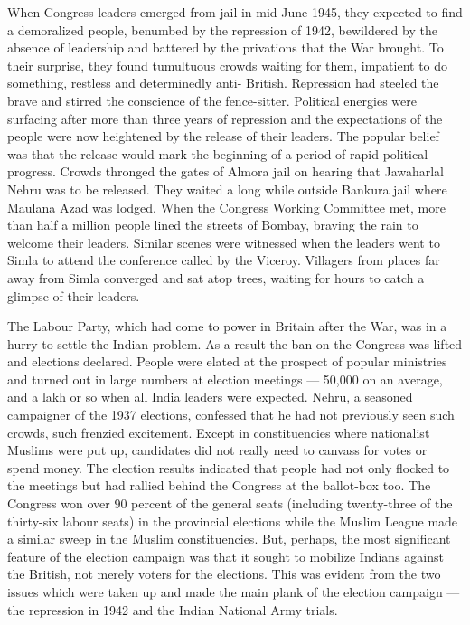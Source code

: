 When Congress leaders emerged from jail in mid-June 1945, they expected to find a demoralized people, benumbed by the repression of 1942, bewildered by the absence of leadership and battered by the privations that the War brought. To their surprise, they found tumultuous crowds waiting for them, impatient to do something, restless and determinedly anti- British. Repression had steeled the brave and stirred the conscience of the fence-sitter. Political energies were surfacing after more than three years of repression and the expectations of the people were now heightened by the release of their leaders. The popular belief was that the release would mark the beginning of a period of rapid political progress. Crowds thronged the gates of Almora jail on hearing that Jawaharlal Nehru was to be released. They waited a long while outside Bankura jail where Maulana Azad was lodged. When the Congress Working Committee met, more than half a million people lined the streets of Bombay, braving the rain to welcome their leaders. Similar scenes were witnessed when the leaders went to Simla to attend the conference called by the Viceroy. Villagers from places far away from Simla converged and sat atop trees, waiting for hours to catch a glimpse of their leaders. 

The Labour Party, which had come to power in Britain after the War, was in a hurry to settle the Indian problem. As a result the ban on the Congress was lifted and elections declared. People were elated at the prospect of popular ministries and turned out in large numbers at election meetings --- 50,000 on an average, and a lakh or so when all India leaders were expected. Nehru, a seasoned campaigner of the 1937 elections, confessed that he had not previously seen such crowds, such frenzied excitement. Except in constituencies where nationalist Muslims were put up, candidates did not really need to canvass for votes or spend money. The election results indicated that people had not only flocked to the meetings but had rallied behind the Congress at the ballot-box too. The Congress won over 90 percent of the general seats (including twenty-three of the thirty-six labour seats) in the provincial elections while the Muslim League made a similar sweep in the Muslim constituencies. But, perhaps, the most significant feature of the election campaign was that it sought to mobilize Indians against the British, not merely voters for the elections. This was evident from the two issues which were taken up and made the main plank of the election campaign --- the repression in 1942 and the Indian National Army trials. 


